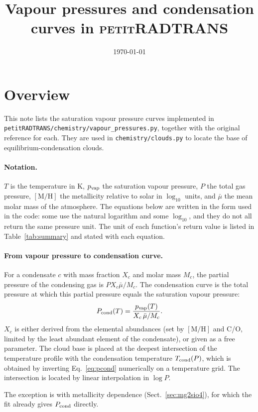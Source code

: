 \documentclass[11pt,a4paper]{article}
\title{Vapour pressures and condensation curves in \textsc{petitRADTRANS}}
\author{}
\date{\today}
\newcommand{\code}[1]{\texttt{#1}}
\newcommand{\pvap}{p_{\rm vap}}
\newcommand{\Pcond}{P_{\rm cond}}
\newcommand{\MH}{[\mathrm{M/H}]}
\newcommand{\chem}[1]{\mathrm{#1}}
\begin{document}
\maketitle

\section{Overview}

This note lists the saturation vapour pressure curves implemented in
\code{petitRADTRANS/chemistry/vapour\_pressures.py}, together with the
original reference for each. They are used in
\code{chemistry/clouds.py} to locate the base of equilibrium-condensation
clouds.

\paragraph{Notation.}
$T$ is the temperature in K, $\pvap$ the saturation vapour pressure, $P$
the total gas pressure, $\MH$ the metallicity relative to solar in $\log_{10}$
units, and $\bar{\mu}$ the mean molar mass of the atmosphere. The equations
below are written in the form used in the code: some use the natural
logarithm and some $\log_{10}$, and they do not all return the same pressure
unit. The unit of each function's return value is listed in
Table~\ref{tab:summary} and stated with each equation.

\paragraph{From vapour pressure to condensation curve.}
For a condensate $c$ with mass fraction $X_c$ and molar mass $M_c$, the
partial pressure of the condensing gas is $P X_c\bar{\mu}/M_c$. The
condensation curve is the total pressure at which this partial pressure
equals the saturation vapour pressure:
\begin{equation}
  \Pcond(T) = \frac{\pvap(T)}{X_c\,\bar{\mu}/M_c} .
  \label{eq:pcond}
\end{equation}
$X_c$ is either derived from the elemental abundances (set by $\MH$ and
C/O, limited by the least abundant element of the condensate), or given as
a free parameter. The cloud base is placed at the deepest intersection
of the temperature profile with the condensation temperature
$T_{\rm cond}(P)$, which is obtained by inverting Eq.~\eqref{eq:pcond}
numerically on a temperature grid. The intersection is located by linear
interpolation in $\log P$.

The exception is \chem{Mg_2SiO_4} with metallicity dependence
(Sect.~\ref{sec:mg2sio4}), for which the fit already gives $\Pcond$ directly.
\end{document}
